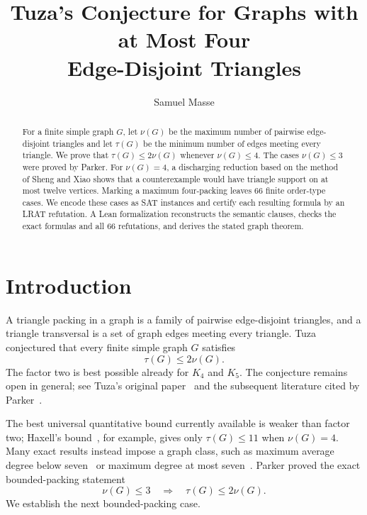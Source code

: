 \documentclass[11pt]{article}
\title{Tuza's Conjecture for Graphs with at Most Four\\Edge-Disjoint Triangles}
\author{Samuel Masse}
\date{}
\theoremstyle{definition}
\begin{document}
\maketitle
\vspace{-2em}

\begin{abstract}
For a finite simple graph $G$, let $\nu(G)$ be the maximum number of
pairwise edge-disjoint triangles and let $\tau(G)$ be the minimum number of
edges meeting every triangle.  We prove that $\tau(G)\leq 2\nu(G)$ whenever
$\nu(G)\leq 4$.  The cases $\nu(G)\leq 3$ were proved by Parker.  For
$\nu(G)=4$, a discharging reduction based on the method of Sheng and Xiao
shows that a counterexample would have triangle support on at most twelve
vertices.  Marking a maximum four-packing leaves 66 finite order-type cases.
We encode these cases as SAT instances and certify each resulting formula by
an LRAT refutation.  A Lean formalization reconstructs the semantic clauses,
checks the exact formulas and all 66 refutations, and derives the stated
graph theorem.
\end{abstract}

\section{Introduction}

A triangle packing in a graph is a family of pairwise edge-disjoint
triangles, and a triangle transversal is a set of graph edges meeting every
triangle.  Tuza conjectured that every finite simple graph $G$ satisfies
\begin{equation}\label{eq:tuza}
  \tau(G)\leq 2\nu(G).
\end{equation}
The factor two is best possible already for $K_4$ and $K_5$.  The conjecture
remains open in general; see Tuza's original paper~\cite{Tuza1990} and the
subsequent literature cited by Parker~\cite{Parker2025}.

The best universal quantitative bound currently available is weaker than
factor two; Haxell's bound~\cite{Haxell1999}, for example, gives only
$\tau(G)\leq11$ when $\nu(G)=4$.  Many exact results instead impose a graph
class, such as maximum average degree below seven~\cite{Puleo2015} or maximum
degree at most seven~\cite{Gupta2026}.  Parker proved the exact
bounded-packing statement
\begin{equation}\label{eq:parker}
  \nu(G)\leq 3 \quad\Longrightarrow\quad \tau(G)\leq 2\nu(G).
\end{equation}
We establish the next bounded-packing case.
\end{document}
